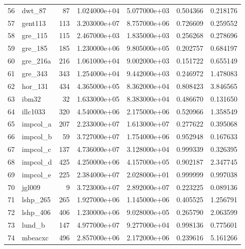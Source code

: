 \begin{tabular}{llrrrrr}
56  &                   dwt\_87 &    87 &  1.024000e+04 &  5.077000e+03 &  0.504366 &   0.218176 \\
57  &                  gent113 &   113 &  3.203000e+07 &  8.757000e+06 &  0.726609 &   0.259552 \\
58  &                  gre\_115 &   115 &  2.467000e+03 &  1.835000e+03 &  0.256268 &   0.278696 \\
59  &                  gre\_185 &   185 &  1.230000e+06 &  9.805000e+05 &  0.202757 &   0.684197 \\
60  &                 gre\_216a &   216 &  1.061000e+04 &  9.002000e+03 &  0.151722 &   0.655149 \\
61  &                  gre\_343 &   343 &  1.254000e+04 &  9.442000e+03 &  0.246972 &   1.478083 \\
62  &                  hor\_131 &   434 &  4.365000e+05 &  8.362000e+04 &  0.808423 &   3.846565 \\
63  &                    ibm32 &    32 &  1.633000e+05 &  8.383000e+04 &  0.486670 &   0.131650 \\
64  &                 illc1033 &   320 &  4.540000e+06 &  2.175000e+06 &  0.520966 &   1.358549 \\
65  &                 impcol\_a &   207 &  2.233000e+07 &  1.613000e+07 &  0.277622 &   0.395068 \\
66  &                 impcol\_b &    59 &  3.727000e+07 &  1.754000e+06 &  0.952948 &   0.167633 \\
67  &                 impcol\_c &   137 &  4.736000e+07 &  3.128000e+04 &  0.999339 &   0.326395 \\
68  &                 impcol\_d &   425 &  4.250000e+06 &  4.157000e+05 &  0.902187 &   2.347745 \\
69  &                 impcol\_e &   225 &  2.384000e+07 &  2.028000e+01 &  0.999999 &   0.997038 \\
70  &                   jgl009 &     9 &  3.723000e+07 &  2.892000e+07 &  0.223225 &   0.089136 \\
71  &                 lshp\_265 &   265 &  1.927000e+06 &  1.145000e+06 &  0.405525 &   1.256791 \\
72  &                 lshp\_406 &   406 &  1.230000e+06 &  9.028000e+05 &  0.265790 &   2.063599 \\
73  &                   lund\_b &   147 &  4.977000e+07 &  9.277000e+04 &  0.998136 &   0.775601 \\
74  &                  mbeacxc &   496 &  2.857000e+06 &  2.172000e+06 &  0.239616 &   5.161266 \\

\end{tabular}
